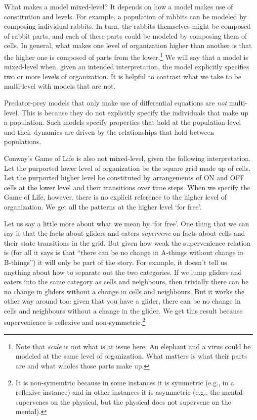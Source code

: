 \documentclass[11pt]{article}
\begin{document}
What makes a model mixed-level? It depends on how a model makes use of constitution and levels. For example, a population of rabbits can be modeled by composing individual rabbits. In turn, the rabbits themselves might be composed of rabbit parts, and each of these parts could be modeled by  composing them of cells.  In general, what makes one level of organization higher than another is that the higher one is composed of parts from the lower.\footnote{Note that \emph{scale} is not what is at issue here. An elephant and a virus could be modeled at the same level of organization. What matters is what their parts are and what wholes those parts make up.} We will say that a model is mixed-level when, given an intended interpretation, the model explicitly specifies two or more levels of organization. It is helpful to contrast what we take to be multi-level with models that are not.

Predator-prey models that only make use of differential equations are \emph{not} multi-level. This is because they do not explicitly specify the individuals that make up a population. Such models specify properties that hold at the population-level and their dynamics are driven by the relationships that hold between populations.

Conway's Game of Life is also not mixed-level, given the following interpretation. Let the purported lower level of organization be the square grid made up of cells. Let the purported higher level be constituted by arrangements of ON and OFF cells at the lower level and their transitions over time steps. When we specify the Game of Life, however, there is no explicit reference to the higher level of organization. We get all the patterns at the higher level `for free'. 

Let us say a little more about what we mean by `for free'. One thing that we can say is that the facts about gliders and eaters \emph{supervene} on facts about cells and their state transitions in the grid.  But given how weak the supervenience relation is (for all it says is that ``there can be no change in A-things without change in B-things'') it will only be part of the story. For example, it doesn't tell us anything about how to separate out the two categories. If we lump gliders and eaters into the same category as cells and neighbours, then trivially there can be no change in gliders without a change in cells and neighbours. But it works the other way around too: given that you have a glider, there can be no change in cells and neighbours without a change in the glider. We get this result because supervenience is reflexive and non-symmetric.\footnote{It is non-symemtric because in some instances it is symmetric (e.g., in a reflexive instance) and in other instances it is asymmetric (e.g., the mental supervenes on the physical, but the physical does not supervene on the mental).}
\end{document}

